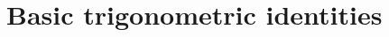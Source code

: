 \documentclass[a4paper,twoside, 11pt]{article}
\begin{document}
\section*{Basic trigonometric identities}











\end{document}
